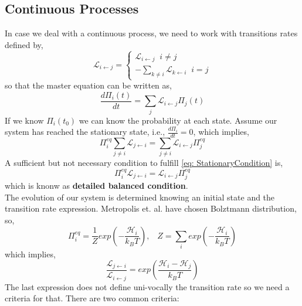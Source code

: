 \subsection{Continuous Processes}
In case we deal with a continuous process, we need to work with transitions rates defined by,
\begin{equation}
    \mathcal{L}_{i \leftarrow j} = 
    \begin{cases}
    \mathcal{L}_{i \leftarrow j} \;\; i\neq j\\
    -\sum_{k\neq i}\mathcal{L}_{k \leftarrow i} \;\; i = j
    \end{cases}
\end{equation}
so that the master equation can be written as,
\begin{equation}
\label{eq: MasterEquationContinuous}
    \frac{d\Pi_{i}(t)}{dt} = \sum_{j}\mathcal{L}_{i \leftarrow j} \Pi_{j}(t)
\end{equation}
If we know $\Pi_{i}(t_{0})$ we can know the probability at each state. Assume our system has reached the stationary state, i.e.,  $\frac{d\Pi_{i}}{dt} = 0$, which implies,
\begin{equation}
\label{eq: StationaryCondition}
    \Pi_{i}^{eq} \sum_{j\neq i} \mathcal{L}_{j \leftarrow i} = \sum_{j \neq i}\mathcal{L}_{i \leftarrow j}\Pi_{j}^{eq} 
\end{equation}
A sufficient but not necessary condition to fulfill \ref{eq: StationaryCondition} is,
\begin{equation}
    \Pi_{i}^{eq}\mathcal{L}_{j \leftarrow i} = \mathcal{L}_{i \leftarrow j}\Pi_{j}^{eq} 
\end{equation}
which is knonw as \textbf{detailed balanced condition}.\\
The evolution of our system is determined knowing an initial state and the transition rate expression. Metropolis et. al. have chosen Bolztmann distribution, so,
\begin{equation}
    \Pi_{i}^{eq} = \frac{1}{Z}exp\left(- \frac{\mathcal{H}_{i}}{k_{B}T}\right), \;\;\; Z = \sum_{i}exp\left(-\frac{\mathcal{H}_{i}}{k_{B}T}\right)
\end{equation}
which implies,
\begin{equation}
    \frac{\mathcal{L}_{j \leftarrow i}}{\mathcal{L}_{i \leftarrow j}} = exp\left(\frac{\mathcal{H}_{i} - \mathcal{H}_{j}}{k_{B}T}\right)
\end{equation}
The last expression does not define uni-vocally the transition rate so we need a criteria for that. There are two common criteria:
